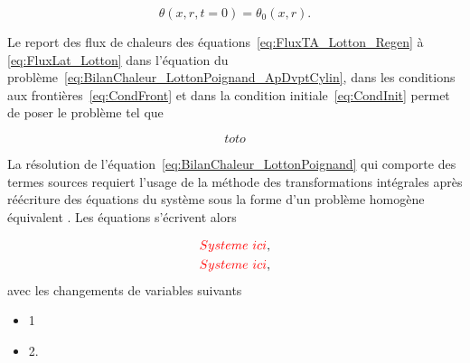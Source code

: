 \begin{equation}
	\theta(x,r,t=0) = \theta_0(x,r).
	\label{eq:CondInit}
\end{equation}

Le report des flux de chaleurs des équations~\eqref{eq:FluxTA_Lotton_Regen} à \eqref{eq:FluxLat_Lotton} dans l'équation du problème~\eqref{eq:BilanChaleur_LottonPoignand_ApDvptCylin}, dans les conditions aux frontières~\eqref{eq:CondFront} et dans la condition initiale~\eqref{eq:CondInit} permet de poser le problème tel que

\begin{equation}
	toto
	\label{eq:ProbTransitoire_ApDvpt}
\end{equation}

La résolution de l'équation~\eqref{eq:BilanChaleur_LottonPoignand} qui comporte des termes sources requiert l'usage de la méthode des transformations intégrales après réécriture des équations du système sous la forme d'un problème homogène équivalent \cite{ozisik_integraltransform_heat_1993}. Les équations s'écrivent alors

\begin{subequations}
	\begin{align}
		\textcolor{red}{Systeme\ ici},\label{eq:1_LottonPoignand}\\
		\textcolor{red}{Systeme\ ici},\label{eq:2_LottonPoignand}
	\end{align}
	\label{eq:SystemeEq_LottonPoignand}
\end{subequations}
avec les changements de variables suivants

\begin{itemize} \color{red}
	\item 1
	\item 2.
\end{itemize}







